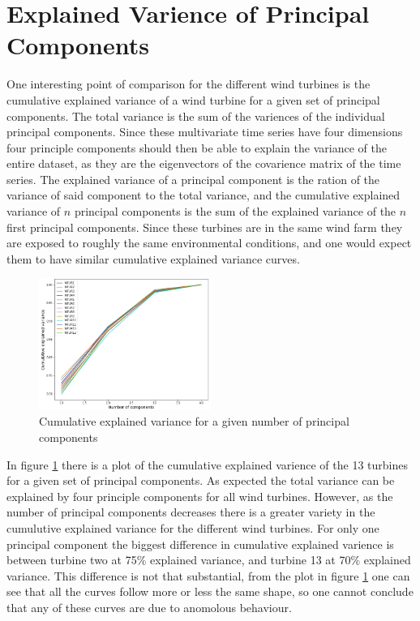 \section{Explained Varience of Principal Components}

One interesting point of comparison for the different wind turbines is the cumulative explained variance of a wind turbine for a given set of principal components. 
The total variance is the sum of the variences of the individual principal components. 
Since these multivariate time series have four dimensions four principle components should then be able to explain the variance of the entire dataset, as they are the eigenvectors of the covarience matrix of the time series. 
The explained variance of a principal component is the ration of the variance of said component to the total variance, and the cumulative explained variance of $n$ principal components is the sum of the explained variance of the $n$ first principal components. Since these turbines are in the same wind farm they are exposed to roughly the same environmental conditions, and one would expect them to have similar cumulative explained variance curves.

\begin{figure}[h]
    \begin{center}
    \includegraphics[width=0.5\textwidth]{data_exp/cumulative_explained_variance}
    \end{center}
    \caption{Cumulative explained variance for a given number of principal components} 
    \label{fig:cum_exp_var}
\end{figure}

In figure \ref{fig:cum_exp_var} there is a plot of the cumulative explained varience of the 13 turbines for a given set of principal components. 
As expected the total variance can be explained by four principle components for all wind turbines. 
However, as the number of principal components decreases there is a greater variety in the cumulutive explained variance for the different wind turbines. 
For only one principal component the biggest difference in cumulative explained varience is between turbine two at 75$\%$ explained variance, and turbine 13 at 70$\%$ explained variance.
This difference is not that substantial, from the plot in figure \ref{fig:cum_exp_var} one can see that all the curves follow more or less the same shape, so one cannot conclude that any of these curves are due to anomolous behaviour. \smallskip

